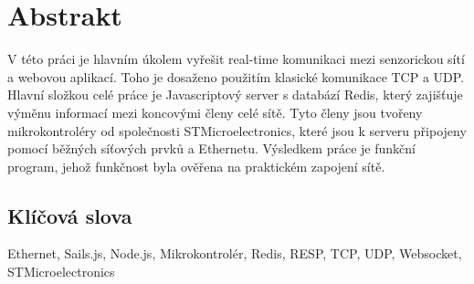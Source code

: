 \chapter*{Abstrakt}
V této práci je hlavním úkolem vyřešit real-time komunikaci mezi senzorickou sítí a webovou aplikací. Toho je dosaženo použitím klasické komunikace TCP a UDP. Hlavní složkou celé práce je Javascriptový server s databází Redis, který zajišťuje výměnu informací mezi koncovými členy celé sítě. Tyto členy jsou tvořeny mikrokontroléry od společnosti STMicroelectronics, které jsou k serveru připojeny pomocí běžných síťových prvků a Ethernetu. Výsledkem práce je funkční program, jehož funkčnost byla ověřena na praktickém zapojení sítě.

\vfill

\section*{Klíčová slova}
Ethernet, Sails.js, Node.js, Mikrokontrolér, Redis, RESP, TCP, UDP, Websocket, STMicroelectronics